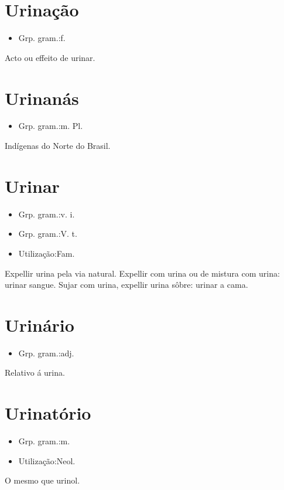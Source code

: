 \documentclass{article}
\begin{document}
\section{Urinação}
\begin{itemize}
\item {Grp. gram.:f.}
\end{itemize}
Acto ou effeito de urinar.
\section{Urinanás}
\begin{itemize}
\item {Grp. gram.:m. Pl.}
\end{itemize}
Indígenas do Norte do Brasil.
\section{Urinar}
\begin{itemize}
\item {Grp. gram.:v. i.}
\end{itemize}
\begin{itemize}
\item {Grp. gram.:V. t.}
\end{itemize}
\begin{itemize}
\item {Utilização:Fam.}
\end{itemize}
Expellir urina pela via natural.
Expellir com urina ou de mistura com urina: \textunderscore urinar sangue\textunderscore .
Sujar com urina, expellir urina sôbre: \textunderscore urinar a cama\textunderscore .
\section{Urinário}
\begin{itemize}
\item {Grp. gram.:adj.}
\end{itemize}
Relativo á urina.
\section{Urinatório}
\begin{itemize}
\item {Grp. gram.:m.}
\end{itemize}
\begin{itemize}
\item {Utilização:Neol.}
\end{itemize}
O mesmo que \textunderscore urinol\textunderscore .
\end{document}
